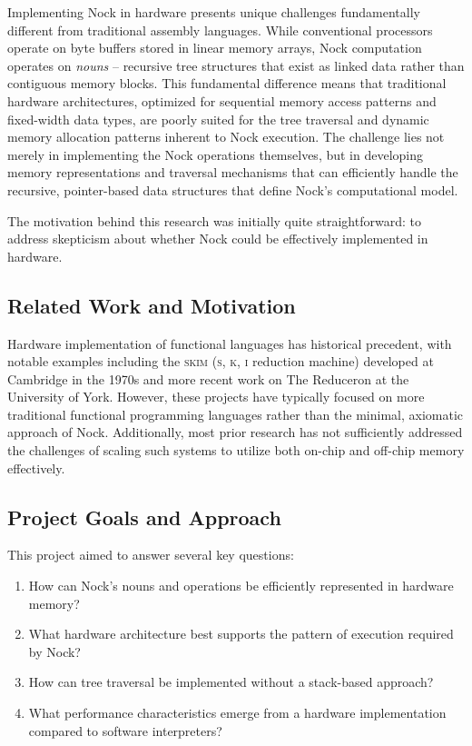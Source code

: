 \documentclass[twoside]{article}
\begin{document}
Implementing Nock in hardware presents unique challenges fundamentally different from traditional assembly languages. While conventional processors operate on byte buffers stored in linear memory arrays, Nock computation operates on \textit{nouns} -- recursive tree structures that exist as linked data rather than contiguous memory blocks. This fundamental difference means that traditional hardware architectures, optimized for sequential memory access patterns and fixed-width data types, are poorly suited for the tree traversal and dynamic memory allocation patterns inherent to Nock execution. The challenge lies not merely in implementing the Nock operations themselves, but in developing memory representations and traversal mechanisms that can efficiently handle the recursive, pointer-based data structures that define Nock's computational model.

The motivation behind this research was initially quite straightforward: to address skepticism about whether Nock could be effectively implemented in hardware.

\subsection{Related Work and Motivation}

Hardware implementation of functional languages has historical precedent, with notable examples including the \textsc{skim} (\textsc{s}, \textsc{k}, \textsc{i} reduction machine) developed at Cambridge in the 1970s and more recent work on The Reduceron at the University of York. However, these projects have typically focused on more traditional functional programming languages rather than the minimal, axiomatic approach of Nock. Additionally, most prior research has not sufficiently addressed the challenges of scaling such systems to utilize both on-chip and off-chip memory effectively.

\subsection{Project Goals and Approach}

This project aimed to answer several key questions:

\begin{enumerate}
  \item How can Nock's nouns and operations be efficiently represented in hardware memory?
  \item What hardware architecture best supports the pattern of execution required by Nock?
  \item How can tree traversal be implemented without a stack-based approach?
  \item What performance characteristics emerge from a hardware implementation compared to software interpreters?
\end{enumerate}
\end{document}
